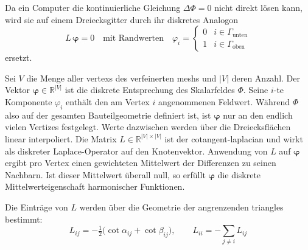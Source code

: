                 Da ein Computer die kontinuierliche Gleichung $\Delta\Phi = 0$ nicht direkt lösen kann, wird sie auf einem Dreiecksgitter durch ihr diskretes Analogon
                \begin{equation}
                    L\,\boldsymbol{\varphi} = 0
                    \quad\text{mit Randwerten}\quad
                    \varphi_i = \begin{cases} 0 & i \in \Gamma_\text{unten}\\ 1 & i \in \Gamma_\text{oben}\end{cases}
                    \label{eq:concept-crystal-discrete-laplace}
                \end{equation}
                ersetzt.

                Sei $V$ die Menge aller \glspl{vertex} des verfeinerten \glspl{mesh} und $\lvert V\rvert$ deren Anzahl.
                Der Vektor $\boldsymbol{\varphi} \in \mathbb{R}^{\lvert V\rvert}$ ist die diskrete Entsprechung des Skalarfeldes $\Phi$.
                Seine $i$-te Komponente $\varphi_i$ enthält den am Vertex $i$ angenommenen Feldwert.
                Während $\Phi$ also auf der gesamten Bauteilgeometrie definiert ist, ist $\boldsymbol{\varphi}$ nur an den endlich vielen Vertizes festgelegt.
                Werte dazwischen werden über die Dreiecksflächen linear interpoliert.
                Die Matrix $L \in \mathbb{R}^{\lvert V\rvert \times \lvert V\rvert}$ ist der \gls{cotangent-laplacian} und wirkt als diskreter Laplace-Operator auf den Knotenvektor.
                Anwendung von $L$ auf $\boldsymbol{\varphi}$ ergibt pro Vertex einen gewichteten Mittelwert der Differenzen zu seinen Nachbarn.
                Ist dieser Mittelwert überall null, so erfüllt $\boldsymbol{\varphi}$ die diskrete Mittelwerteigenschaft harmonischer Funktionen.

                Die Einträge von $L$ werden über die Geometrie der angrenzenden \glspl{triangle} bestimmt:
                \begin{equation}
                    L_{ij} = -\tfrac{1}{2}\bigl(\cot \alpha_{ij} + \cot \beta_{ij}\bigr),
                    \qquad
                    L_{ii} = -\sum_{j \neq i} L_{ij}
                    \label{eq:concept-crystal-cotangent}
                \end{equation}

